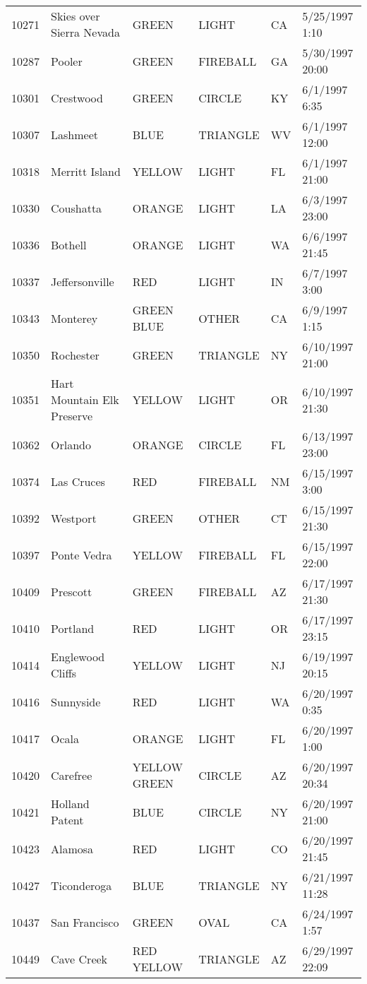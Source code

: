\begin{tabular}{llllll}
10271 & Skies over Sierra Nevada & GREEN & LIGHT & CA & 5/25/1997 1:10 \\
10287 & Pooler & GREEN & FIREBALL & GA & 5/30/1997 20:00 \\
10301 & Crestwood & GREEN & CIRCLE & KY & 6/1/1997 6:35 \\
10307 & Lashmeet & BLUE & TRIANGLE & WV & 6/1/1997 12:00 \\
10318 & Merritt Island & YELLOW & LIGHT & FL & 6/1/1997 21:00 \\
10330 & Coushatta & ORANGE & LIGHT & LA & 6/3/1997 23:00 \\
10336 & Bothell & ORANGE & LIGHT & WA & 6/6/1997 21:45 \\
10337 & Jeffersonville & RED & LIGHT & IN & 6/7/1997 3:00 \\
10343 & Monterey & GREEN BLUE & OTHER & CA & 6/9/1997 1:15 \\
10350 & Rochester & GREEN & TRIANGLE & NY & 6/10/1997 21:00 \\
10351 & Hart Mountain Elk Preserve & YELLOW & LIGHT & OR & 6/10/1997 21:30 \\
10362 & Orlando & ORANGE & CIRCLE & FL & 6/13/1997 23:00 \\
10374 & Las Cruces & RED & FIREBALL & NM & 6/15/1997 3:00 \\
10392 & Westport & GREEN & OTHER & CT & 6/15/1997 21:30 \\
10397 & Ponte Vedra & YELLOW & FIREBALL & FL & 6/15/1997 22:00 \\
10409 & Prescott & GREEN & FIREBALL & AZ & 6/17/1997 21:30 \\
10410 & Portland & RED & LIGHT & OR & 6/17/1997 23:15 \\
10414 & Englewood Cliffs & YELLOW & LIGHT & NJ & 6/19/1997 20:15 \\
10416 & Sunnyside & RED & LIGHT & WA & 6/20/1997 0:35 \\
10417 & Ocala & ORANGE & LIGHT & FL & 6/20/1997 1:00 \\
10420 & Carefree & YELLOW GREEN & CIRCLE & AZ & 6/20/1997 20:34 \\
10421 & Holland Patent & BLUE & CIRCLE & NY & 6/20/1997 21:00 \\
10423 & Alamosa & RED & LIGHT & CO & 6/20/1997 21:45 \\
10427 & Ticonderoga & BLUE & TRIANGLE & NY & 6/21/1997 11:28 \\
10437 & San Francisco & GREEN & OVAL & CA & 6/24/1997 1:57 \\
10449 & Cave Creek & RED YELLOW & TRIANGLE & AZ & 6/29/1997 22:09 \\

\end{tabular}
